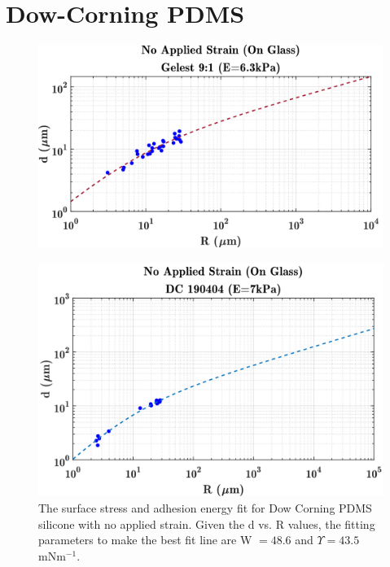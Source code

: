 \section{Dow-Corning PDMS}


\begin{figure}
	\centering
	\includegraphics[width=\linewidth]{Chapters/Figures/w_ups_fit_G9-1}
	\caption[Gelest W-$\Upsilon$ Fit]{}
	\label{fig:wupsfitg9-1}
\end{figure}


\begin{figure}[h]
	\centering
	\includegraphics[width=\linewidth]{Chapters/Figures/WUps_fit_DC190404}
	\caption[D-C W $\Upsilon $ Fit]{The surface stress and adhesion energy fit for Dow Corning PDMS silicone with no applied strain. Given the d vs. R values, the fitting parameters to make the best fit line are W $ = 48.6$ and  $\Upsilon = 43.5$ mNm$^{-1}$.}
	\label{fig:wupsfitdc190404}
\end{figure}
